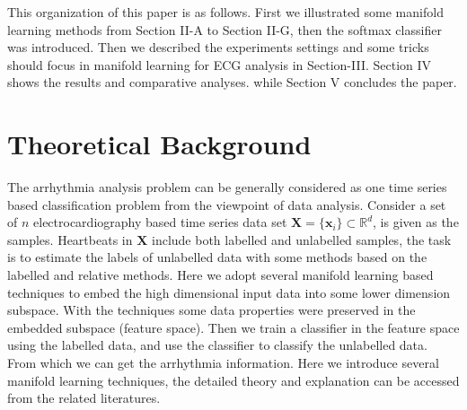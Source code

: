 \documentclass[journal]{IEEEtran}
\begin{document}
\lipsum[2]

This organization of this paper is as follows. First we illustrated some manifold learning methods from Section II-A to Section II-G, then the softmax classifier was introduced. Then we described the experiments settings and some tricks should focus in manifold learning for ECG analysis in Section-III. Section IV shows the results and comparative analyses. while Section V concludes the paper.





%
%

\section{Theoretical Background}
The arrhythmia analysis problem can be generally considered as one time series based classification problem from the viewpoint of data analysis.
Consider a set of $n$ electrocardiography based time series data set $\boldsymbol{X} = \{\boldsymbol{x}_i\} \subset \mathbb{R}^d$, is given as the samples.
Heartbeats in $\boldsymbol{X}$ include both labelled and unlabelled samples, the task is to estimate the labels of unlabelled data with some methods based on the labelled and relative methods.
Here we adopt several manifold learning based techniques to embed the high dimensional input data into some lower dimension subspace. 
With the techniques some data properties were preserved in the embedded subspace (feature space).
Then we train a classifier in the feature space using the labelled data, and use the classifier to classify the unlabelled data. From which we can get the arrhythmia information. 
Here we introduce several manifold learning techniques, the detailed theory and explanation can be accessed from the related literatures.
\end{document}

